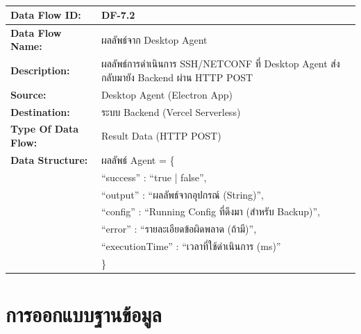\begin{table}[H]
    \caption{}
    \label{tab:df-7-2}
    \fontSixTeen 
    \begin{tabularx}{\textwidth}{|l|L|} 
        \hline
        \textbf{Data Flow ID:} & DF-7.2 \\
        \hline
        \textbf{Data Flow Name:} & ผลลัพธ์จาก Desktop Agent \\
        \hline
        \textbf{Description:} & ผลลัพธ์การดำเนินการ SSH/NETCONF ที่ Desktop Agent ส่งกลับมายัง Backend ผ่าน HTTP POST \\
        \hline
        \textbf{Source:} & Desktop Agent (Electron App) \\
        \hline
        \textbf{Destination:} & ระบบ Backend (Vercel Serverless) \\
        \hline
        \textbf{Type Of Data Flow:} & Result Data (HTTP POST) \\
        \hline
        \textbf{Data Structure:} & ผลลัพธ์ Agent = \{ \nonumber \\
                        & \hspace{1em} ``success'' : ``true | false'', \nonumber \\
                        & \hspace{1em} ``output'' : ``ผลลัพธ์จากอุปกรณ์ (String)'', \nonumber \\
                        & \hspace{1em} ``config'' : ``Running Config ที่ดึงมา (สำหรับ Backup)'', \nonumber \\
                        & \hspace{1em} ``error'' : ``รายละเอียดข้อผิดพลาด (ถ้ามี)'', \nonumber \\
                        & \hspace{1em} ``executionTime'' : ``เวลาที่ใช้ดำเนินการ (ms)'' \nonumber \\
                        & \} \\
        \hline
    \end{tabularx}
\end{table}


\section{การออกแบบฐานข้อมูล}

